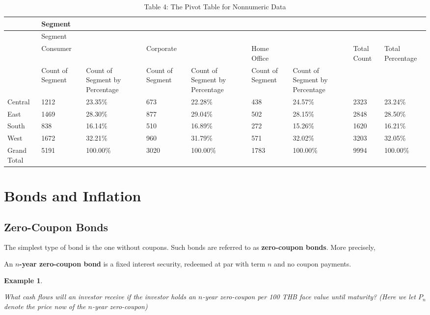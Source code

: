 \documentclass[
]{article}
\theoremstyle{definition}
\theoremstyle{definition}
\newtheorem{example}{Example}[section]
\theoremstyle{definition}
\theoremstyle{definition}
\theoremstyle{remark}
\begin{document}
\begin{longtable}[]{@{}lllllllll@{}}
\caption{Table 4: The Pivot Table for Nonnumeric Data}\tabularnewline
\toprule
& Segment & & & & & & & \\
\midrule
\endfirsthead
\toprule
& Segment & & & & & & & \\
\midrule
\endhead
& Consumer & & Corporate & & Home Office & & Total Count & Total Percentage \\
& Count of Segment & Count of Segment by Percentage & Count of Segment & Count of Segment by Percentage & Count of Segment & Count of Segment by Percentage & & \\
Central & 1212 & 23.35\% & 673 & 22.28\% & 438 & 24.57\% & 2323 & 23.24\% \\
East & 1469 & 28.30\% & 877 & 29.04\% & 502 & 28.15\% & 2848 & 28.50\% \\
South & 838 & 16.14\% & 510 & 16.89\% & 272 & 15.26\% & 1620 & 16.21\% \\
West & 1672 & 32.21\% & 960 & 31.79\% & 571 & 32.02\% & 3203 & 32.05\% \\
Grand Total & 5191 & 100.00\% & 3020 & 100.00\% & 1783 & 100.00\% & 9994 & 100.00\% \\
\bottomrule
\end{longtable}

\hypertarget{bonds-and-inflation}{%
\section{Bonds and Inflation}\label{bonds-and-inflation}}

\hypertarget{zero-coupon-bonds}{%
\subsection{Zero-Coupon Bonds}\label{zero-coupon-bonds}}

The simplest type of bond is the one without coupons. Such bonds are
referred to as \textbf{zero-coupon bonds}. More precisely,

An \textbf{\(n\)-year zero-coupon bond} is a fixed interest security, redeemed
at par with term \(n\) and no coupon payments.

\begin{example}
\protect\hypertarget{exm:unlabeled-div-13}{}\label{exm:unlabeled-div-13}

\emph{What cash flows will an investor receive if the investor
holds an \(n\)-year zero-coupon per 100 THB face value until maturity? (Here
we let \(P_n\) denote the price now of the \(n\)-year zero-coupon)}

\end{example}
\end{document}

